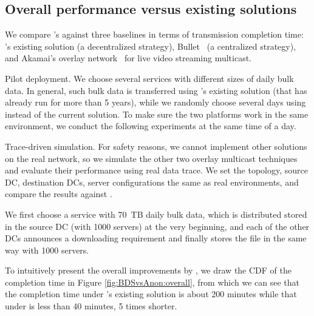 \subsection{Overall performance versus existing solutions}
\label{subsec:evaluation:centralized}

We compare \name's against three baselines in terms of
transmission completion time:
\company's existing solution (a decentralized strategy),
Bullet~\cite{kostic2003bullet} (a centralized strategy), and
Akamai's overlay network~\cite{Andreev2013Designing} for live video streaming
multicast.


Pilot deployment. We choose several services with different sizes of daily bulk data. In general, such bulk data is transferred using \company's existing solution (that has already run for more than 5 years), while we randomly choose several days using \name instead of the current solution. To make sure the two platforms work in the same environment, we conduct the following experiments at the same time of a day.

Trace-driven simulation. For safety reasons, we cannot implement other solutions on the real network, so we simulate the other two overlay multicast techniques and evaluate their performance using real data trace. We set the topology, source DC, destination DCs, server configurations the same as real environments, and compare the results against \name.




We first choose a service with 70~TB daily bulk data, which is distributed stored in the source DC (with 1000 servers) at the very beginning, and each of the other DCs announces a downloading requirement and finally stores the file in the same way with 1000 servers.


To intuitively present the overall improvements by \name, we draw the CDF of the completion time in Figure \ref{fig:BDSvsAnon:overall}, from which we can see that the completion time under \company's existing solution is about 200 minutes while that under \name is less than 40 minutes, 5 times shorter.

